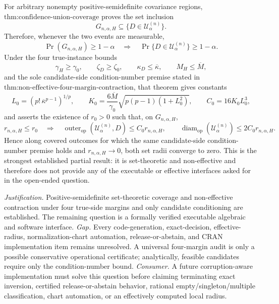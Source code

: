 \documentclass{article}
\begin{document}
For arbitrary nonempty positive-semidefinite covariance regions, \(\text{thm:confidence-union-coverage}\) proves the set inclusion
\[
G_{n,\alpha,H}\subseteq\{D\in\mathcal U^{(n)}_\alpha\}.
\]
Therefore, whenever the two events are measurable,
\[
\Pr(G_{n,\alpha,H})\geq 1-\alpha
\quad\Longrightarrow\quad
\Pr\{D\in\mathcal U^{(n)}_\alpha\}\geq 1-\alpha.
\]
Under the four true-instance bounds
\[
\gamma_H\geq\gamma_0,
\qquad
\zeta_D\geq\zeta_0,
\qquad
\kappa_D\leq\overline\kappa,
\qquad
M_H\leq\overline M,
\]
and the sole candidate-side condition-number premise stated in \(\text{thm:non-effective-four-margin-contraction}\), that theorem gives constants
\[
L_0=(p!\,\overline\kappa^{p-1})^{1/p},
\qquad
K_0=\frac{6\overline M}{\gamma_0}
\sqrt{p(p-1)(1+L_0^2)},
\qquad
C_0=16K_0L_0^3,
\]
and asserts the existence of \(r_0>0\) such that, on \(G_{n,\alpha,H}\),
\[
r_{n,\alpha,H}\leq r_0
\quad\Longrightarrow\quad
\operatorname{outer}_{\mathrm{op}}(\mathcal U^{(n)}_\alpha,D)
\leq C_0r_{n,\alpha,H},
\qquad
\operatorname{diam}_{\mathrm{op}}(\mathcal U^{(n)}_\alpha)
\leq 2C_0r_{n,\alpha,H}.
\]
Hence along covered outcomes for which the same candidate-side condition-number premise holds and \(r_{n,\alpha,H}\to0\), both set radii converge to zero. This is the strongest established partial result: it is set-theoretic and non-effective and therefore does not provide any of the executable or effective interfaces asked for in the open-ended question.
\par\smallskip\noindent \textit{Justification.} Positive-semidefinite set-theoretic coverage and non-effective contraction under four true-side margins and only candidate conditioning are established. The remaining question is a formally verified executable algebraic and software interface. \textit{Gap.} Every code-generation, exact-decision, effective-radius, normalization-chart automation, release-or-abstain, and CRAN implementation item remains unresolved. A universal four-margin audit is only a possible conservative operational certificate; analytically, feasible candidates require only the condition-number bound. \textit{Consumer.} A future corruption-aware implementation must solve this question before claiming terminating exact inversion, certified release-or-abstain behavior, rational empty/singleton/multiple classification, chart automation, or an effectively computed local radius.
\end{document}
